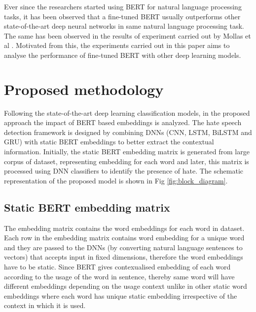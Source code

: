 \documentclass[runningheads]{llncs}
\begin{document}
Ever since the researchers started using BERT \cite{devlin2018bert} for natural language processing tasks, it has been observed that a fine-tuned BERT usually outperforms other state-of-the-art deep neural networks in same natural language processing task. The same has been observed in the results of experiment carried out by Mollas et al \cite{mollas2020ethos}. Motivated from this, the experiments carried out in this paper aims to analyse the performance of fine-tuned BERT with other deep learning models.

\section{Proposed methodology}
Following the state-of-the-art deep learning classification models, in the proposed approach the impact of BERT based embeddings is analyzed. The hate speech detection framework is designed by combining DNNs (CNN, LSTM, BiLSTM and GRU) with static BERT embeddings to better extract the contextual information. Initially, the static BERT embedding matrix is generated from large corpus of dataset, representing embedding for each word and later, this matrix is processed using DNN classifiers to identify the presence of hate. The schematic representation of the proposed model is shown in Fig \ref{fig:block_diagram}.

\subsection{Static BERT embedding matrix}
The embedding matrix contains the word embeddings for each word in dataset. Each row in the embedding matrix contains word embedding for a unique word and they are passed to the DNNs (by converting natural language sentences to vectors) that accepts input in fixed dimensions, therefore the word embeddings have to be static. Since BERT \cite{devlin2018bert} gives contexualised embedding of each word according to the usage of the word in sentence, thereby same word will have different embeddings depending on the usage context unlike in other static word embeddings where each word has unique static embedding irrespective of the context in which it is used. 
\end{document}
